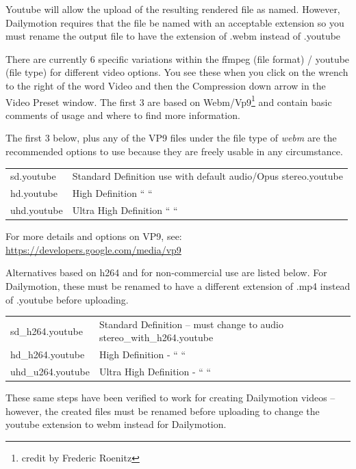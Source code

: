 Youtube will allow the upload of the resulting rendered file as named.  However, Dailymotion requires that the file be named with an acceptable extension so you must rename the output file to have the extension of .webm instead of .youtube

There are currently 6 specific variations within the ffmpeg (file format) / youtube (file type) for different video options.  You see these when you click on the wrench to the right of the word Video and then the Compression down arrow in the Video Preset window.  The first 3 are based on Webm/Vp9\protect\footnote{credit by Frederic Roenitz} and contain basic comments of usage and where to find more information.

The first 3 below, plus any of the VP9 files under the file type of \textit{webm} are the recommended options to use because they are freely usable in any circumstance.

\begin{center}
	\begin{tabular}{lp{8cm}}
		\hline
		sd.youtube & Standard Definition use with default audio/Opus stereo.youtube \\
		hd.youtube & High Definition “ “ \\
		uhd.youtube & Ultra High Definition “ “ \\
		\hline
	\end{tabular}
\end{center}

For more details and options on VP9, see: {\small\url{https://developers.google.com/media/vp9}}

Alternatives based on h264 and for non-commercial use are listed below.  For Dailymotion, these must be renamed to have a different extension of .mp4 instead of .youtube before uploading.

\begin{center}
	\begin{tabular}{lp{8cm}}
		\hline
		sd\_h264.youtube & Standard Definition – must change to audio stereo\_with\_h264.youtube \\
		hd\_h264.youtube & High Definition -          “ “ \\
		uhd\_u264.youtube & Ultra High Definition - “ “ \\
		\hline
	\end{tabular}
\end{center}

These same steps have been verified to work for creating Dailymotion videos -- however, the created files must be renamed before uploading to change the youtube extension to webm instead for Dailymotion.

